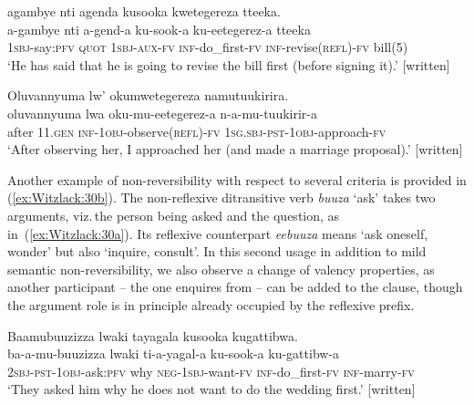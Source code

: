 \documentclass[output=paper,colorlinks,citecolor=brown,
]{langscibook}
\begin{document}
\ea\label{ex:Witzlack:29}

    \ea \label{ex:Witzlack:29a}
    \glll agambye nti agenda kusooka kwetegereza tteeka.\\
    a-gambye 	nti	a-gend-a	ku-sook-a	ku-eetegerez-a	tteeka\\
    \textsc{1sbj}-say:\textsc{pfv}	\textsc{quot}	\textsc{1sbj-aux-fv}	\textsc{inf}-do\_first-\textsc{fv}	\textsc{inf-}revise(\textsc{refl})-\textsc{fv}	bill(5)\\
    \glt ‘He has said that he is going to revise the bill first (before signing it).’ [written]%
    
\ex \label{ex:Witzlack:29b}
    \glll Oluvannyuma lw’ okumwetegereza namutuukirira.\\
    oluvannyuma	lwa	oku-mu-eetegerez-a	n-a-mu-tuukirir-a\\
    after \textsc{11.gen} \textsc{inf-1obj-}observe(\textsc{refl})-\textsc{fv} \textsc{1sg.sbj-pst-1obj}-approach-\textsc{fv}\\
    \glt ‘After observing her, I approached her (and made a marriage proposal).’ [written]%

\z
\z


Another example of non-reversibility with respect to several criteria is provided in (\ref{ex:Witzlack:30b}). 
The non-reflexive ditransitive verb \emph{buuza} ‘ask’ takes two arguments, viz.\,the person being asked and the question, as in~(\ref{ex:Witzlack:30a}). 
Its reflexive counterpart \emph{eebuuza} means ‘ask oneself, wonder’ but also ‘inquire, consult’. 
In this second usage in addition to mild semantic non-reversibility, we also observe a change of valency properties, as another participant – the one enquires from – can be added to the clause, though the argument role is in principle already occupied by the reflexive prefix.

\ea\label{ex:Witzlack:30}

\ea \label{ex:Witzlack:30a}
    \glll Baamubuuzizza lwaki tayagala kusooka kugattibwa.\\
    ba-a-mu-buuzizza lwaki	ti-a-yagal-a	ku-sook-a		ku-gattibw-a\\
    \textsc{2sbj}-\textsc{pst-1obj}-ask:\textsc{pfv}	why		\textsc{neg-1sbj}-want-\textsc{fv}	\textsc{inf}-do\_first-\textsc{fv}	\textsc{inf}-marry-\textsc{fv}\\
    \glt ‘They asked him why he does not want to do the wedding first.’ [written]%
\end{document}
